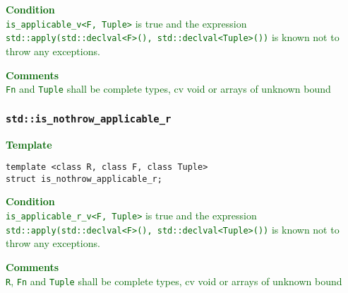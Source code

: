 \documentclass{article}
\begin{document}
\textcolor{darkgreen}{\textbf{Condition}} \\
\textcolor{darkgreen}{\texttt{is\_applicable\_v<F, Tuple>} is true
and the expression \texttt{std::apply(std::declval<F>(),
std::declval<Tuple>())} is known not to throw any exceptions.}

\textcolor{darkgreen}{\textbf{Comments}} \\
\textcolor{darkgreen}{\texttt{Fn} and \texttt{Tuple} shall be complete types,
cv void or arrays of unknown bound}

\subsubsection{\texttt{std::is\_nothrow\_applicable\_r}}
\textcolor{darkgreen}{\textbf{Template}}
\begin{lstlisting}[style=base]
template <class R, class F, class Tuple>
struct is_nothrow_applicable_r;
\end{lstlisting}

\textcolor{darkgreen}{\textbf{Condition}} \\
\textcolor{darkgreen}{\texttt{is\_applicable\_r\_v<F, Tuple>} is true
and the expression \texttt{std::apply(std::declval<F>(),
std::declval<Tuple>())} is known not to throw any exceptions.}

\textcolor{darkgreen}{\textbf{Comments}} \\
\textcolor{darkgreen}{\texttt{R}, \texttt{Fn} and \texttt{Tuple} shall be
complete types, cv void or arrays of unknown bound}
\end{document}
